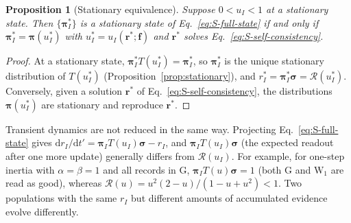 \documentclass[fleqn,10pt]{article}
\theoremstyle{plain}
\newtheorem{proposition}{Proposition}
\theoremstyle{remark}
\newcommand{\Rm}{\mathcal R}
\newcommand{\G}{\mathrm G}
\newcommand{\W}{\mathrm W}
\begin{document}
\begin{proposition}[Stationary equivalence]\label{prop:equivalence}
Suppose $0<u_I<1$ at a stationary state. Then $\{\boldsymbol\pi_I^*\}$ is a
stationary state of Eq.~\eqref{eq:S-full-state} if and only if
$\boldsymbol\pi_I^*=\boldsymbol\pi(u_I^*)$ with $u_I^*=u_I(\boldsymbol r^*;\boldsymbol f)$
and $\boldsymbol r^*$ solves Eq.~\eqref{eq:S-self-consistency}.
\end{proposition}
\begin{proof}
At a stationary state, $\boldsymbol\pi_I^*T(u_I^*)=\boldsymbol\pi_I^*$, so
$\boldsymbol\pi_I^*$ is the unique stationary distribution of $T(u_I^*)$
(Proposition~\ref{prop:stationary}), and
$r_I^*=\boldsymbol\pi_I^*\boldsymbol\sigma=\Rm(u_I^*)$. Conversely, given a solution
$\boldsymbol r^*$ of Eq.~\eqref{eq:S-self-consistency}, the distributions
$\boldsymbol\pi(u_I^*)$ are stationary and reproduce $\boldsymbol r^*$.
\end{proof}

Transient dynamics are not reduced in the same way. Projecting
Eq.~\eqref{eq:S-full-state} gives
$\mathrm dr_I/\mathrm dt'=\boldsymbol\pi_IT(u_I)\boldsymbol\sigma-r_I$, and
$\boldsymbol\pi_IT(u_I)\boldsymbol\sigma$ (the expected readout after one more
update) generally differs from $\Rm(u_I)$. For example, for one-step inertia
with $\alpha=\beta=1$ and all records in $\G$,
$\boldsymbol\pi_IT(u)\boldsymbol\sigma=1$ (both $\G$ and $\W_1$ are read as good),
whereas $\Rm(u)=u^2(2-u)/(1-u+u^2)<1$. Two populations with the same $r_I$ but
different amounts of accumulated evidence evolve differently.
\end{document}
